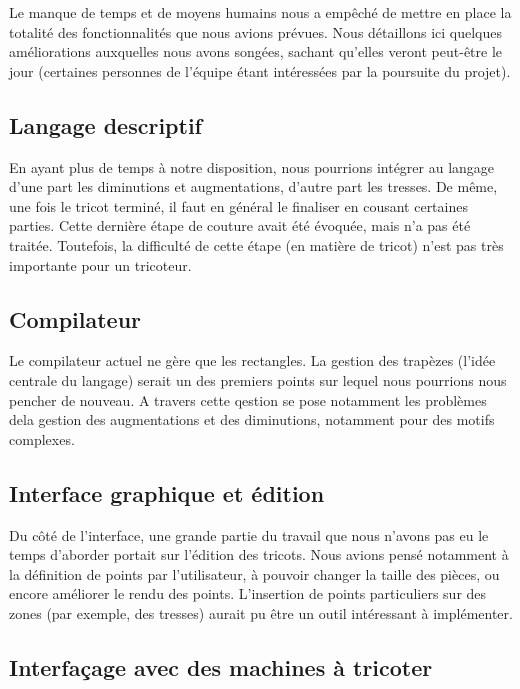 \documentclass{article}
\begin{document}
Le manque de temps et de moyens humains nous a empêché de mettre en
place la totalité des fonctionnalités que nous avions prévues. Nous détaillons
ici quelques améliorations auxquelles nous avons songées, sachant qu'elles veront
peut-être le jour (certaines personnes de l'équipe étant intéressées par la 
poursuite du projet).

\subsection{Langage descriptif}

En ayant plus de temps à notre disposition, nous pourrions intégrer au
langage d'une part les diminutions et augmentations, d'autre part les
tresses. De même, une fois le tricot terminé, il faut en général le
finaliser en cousant certaines parties. Cette dernière étape de
couture avait été évoquée, mais n'a pas été traitée. Toutefois, la
difficulté de cette étape (en matière de tricot) n'est pas très
importante pour un tricoteur.

\subsection{Compilateur}

Le compilateur actuel ne gère que les rectangles. La gestion des trapèzes 
(l'idée centrale du langage) serait un des premiers points sur lequel nous
pourrions nous pencher de nouveau. A travers cette qestion se pose notamment
les problèmes dela gestion des augmentations et des diminutions, notamment pour
des motifs complexes.

\subsection{Interface graphique et édition}

Du côté de l'interface, une grande partie du travail que nous n'avons
pas eu le temps d'aborder portait sur l'édition des tricots. Nous
avions pensé notamment à la définition de points par l'utilisateur, à
pouvoir changer la taille des pièces, ou encore améliorer le rendu des
points. L'insertion de points particuliers sur des zones (par exemple,
des tresses) aurait pu être un outil intéressant à implémenter.

\subsection{Interfaçage avec des machines à tricoter}
\end{document}
